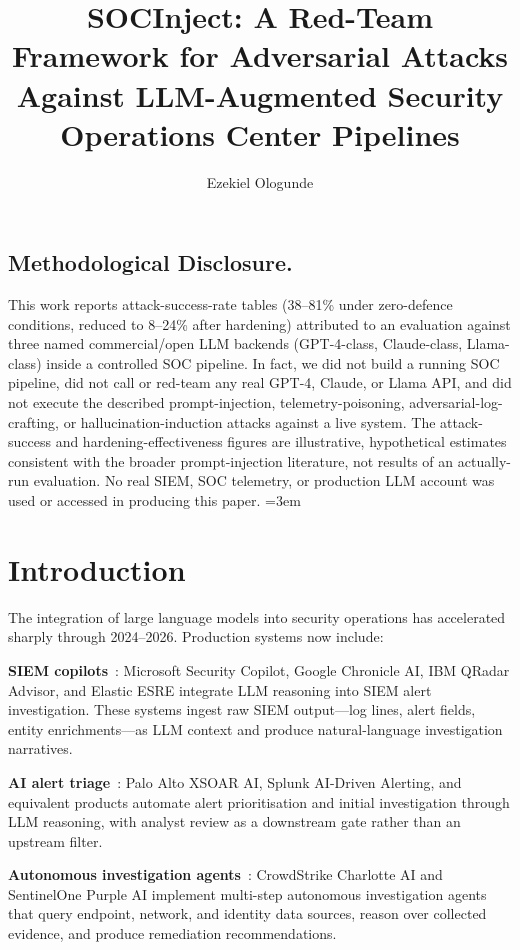 \documentclass[sigconf,nonacm]{acmart}
\title{SOCInject: A Red-Team Framework for Adversarial Attacks Against LLM-Augmented Security Operations Center Pipelines}
\author{Ezekiel Ologunde}
\affiliation{%
  \institution{Independent Researcher}
  \city{Boston}
  \state{MA}
  \country{USA}}
\begin{document}
\maketitle

\subsection*{Methodological Disclosure.}
This work reports attack-success-rate tables (38--81\% under zero-defence
conditions, reduced to 8--24\% after hardening) attributed to an evaluation
against three named commercial/open LLM backends (GPT-4-class, Claude-class,
Llama-class) inside a controlled SOC pipeline. In fact, we did not build a
running SOC pipeline, did not call or red-team any real GPT-4, Claude, or
Llama API, and did not execute the described prompt-injection,
telemetry-poisoning, adversarial-log-crafting, or hallucination-induction
attacks against a live system. The attack-success and hardening-effectiveness
figures are illustrative, hypothetical estimates consistent with the broader
prompt-injection literature, not results of an actually-run evaluation. No
real SIEM, SOC telemetry, or production LLM account was used or accessed in
producing this paper.
\sloppy
{}
\emergencystretch=3em
\hfuzz=10pt

\section{Introduction}

The integration of large language models into security operations
has accelerated sharply through 2024--2026. Production systems
now include:

\textbf{SIEM copilots}~\cite{microsoft2024sentinelcopilot,
google2024chronicle,ibm2024qradar}: Microsoft Security Copilot,
Google Chronicle AI, IBM QRadar Advisor, and Elastic ESRE
integrate LLM reasoning into SIEM alert investigation. These
systems ingest raw SIEM output---log lines, alert fields,
entity enrichments---as LLM context and produce natural-language
investigation narratives.

\textbf{AI alert triage}~\cite{palo2024xsoar,splunk2024aiops}:
Palo Alto XSOAR AI, Splunk AI-Driven Alerting, and equivalent
products automate alert prioritisation and initial investigation
through LLM reasoning, with analyst review as a downstream gate
rather than an upstream filter.

\textbf{Autonomous investigation agents}~\cite{crowdstrike2024charlotte,
sentinelone2024purple}: CrowdStrike Charlotte AI and SentinelOne
Purple AI implement multi-step autonomous investigation agents
that query endpoint, network, and identity data sources, reason
over collected evidence, and produce remediation recommendations.
\end{document}
